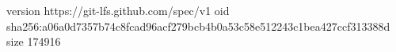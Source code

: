 version https://git-lfs.github.com/spec/v1
oid sha256:a06a0d7357b74c8fcad96acf279bcb4b0a53c58e512243c1bea427ccf313388d
size 174916
